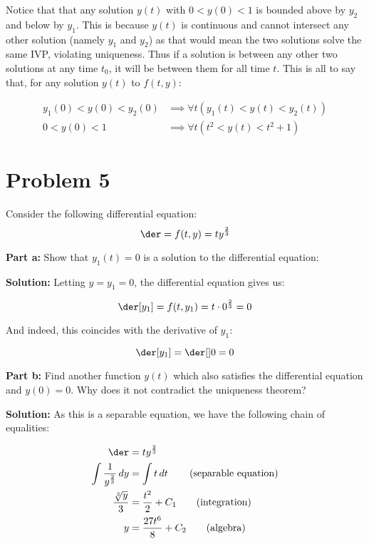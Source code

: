 \documentclass{article}
\begin{document}
Notice that that any solution $y(t)$ with $0<y(0)<1$ is bounded above by $y_2$ and below by $y_1$. This is because $y(t)$ is continuous and cannot intersect any other solution (namely $y_1$ and $y_2$) as that would mean the two solutions solve the same IVP, violating uniqueness. Thus if a solution is between any other two solutions at any time $t_0$, it will be between them for all time $t$. This is all to say that, for any solution $y(t)$ to $f(t,y)$:

\begin{align*}
    y_1(0)<y(0)<y_2(0)&\implies \forall t(y_1(t)<y(t)<y_2(t))\\
    0<y(0)<1&\implies \forall t(t^2<y(t)<t^2+1)
\end{align*}

\section*{Problem 5}
Consider the following differential equation:
\begin{equation*}
    \der=f(t,y)=ty^{\frac{2}{3}}
\end{equation*}

\noindent\textbf{Part a:} Show that $y_1(t)=0$ is a solution to the differential equation:
\bigskip

\noindent\textbf{Solution:} Letting $y=y_1=0$, the differential equation gives us:

\begin{equation*}
    \der[y_1]=f(t,y_1)=t\cdot0^{\frac{2}{3}}=0
\end{equation*}

And indeed, this coincides with the derivative of $y_1$:

\begin{equation*}
    \der[y_1]=\der[]0=0
\end{equation*}
\smallskip

\noindent\textbf{Part b:} Find another function $y(t)$ which also satisfies the differential equation and $y(0) = 0$. Why does it not contradict the uniqueness theorem?
\bigskip
\pagebreak

\noindent\textbf{Solution:} As this is a separable equation, we have the following chain of equalities:

\begin{align*}
    \der&=ty^{\frac{2}{3}}\\
    \int \frac{1}{y^{\frac{2}{3}}}\mathop{dy}&=\int t\mathop{dt}\tag{separable equation}\\
    \frac{\sqrt[3]{y}}{3}&=\frac{t^2}{2}+C_1\tag{integration}\\
    y&=\frac{27t^6}{8}+C_2\tag{algebra}\\
\end{align*}
\end{document}
